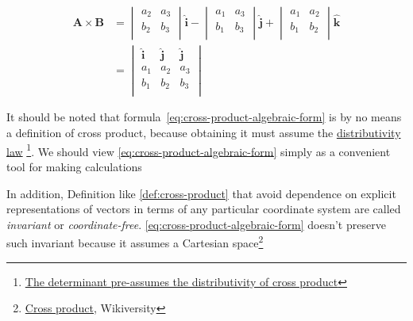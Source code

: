\begin{align}
    \boldsymbol{A} \times \boldsymbol{B} &=
    \begin{vmatrix}
        a_2 & a_3 \\
        b_2 & b_3 \\
    \end{vmatrix} \boldsymbol{\hat{i}} -
    \begin{vmatrix}
        a_1 & a_3 \\
        b_1 & b_3 \\
    \end{vmatrix} \boldsymbol{\hat{j}} +
    \begin{vmatrix}
        a_1 & a_2 \\
        b_1 & b_2 \\
    \end{vmatrix} \boldsymbol{\hat{k}} \\ &=
    \begin{vmatrix}
        \boldsymbol{\hat{i}} & \boldsymbol{\hat{j}} & \boldsymbol{\hat{j}} \\
        a_1 & a_2 & a_3 \\
        b_1 & b_2 & b_3 \\
    \end{vmatrix} \label{eq:cross-product-algebraic-form}
\end{align}

\begin{tcolorbox}[
    parbox=false,
    enhanced,
    colback=red!5!white,colframe=red!75!black,
    watermark tikz={\draw[line width=2mm] circle (1cm) node{\fontfamily{ptm}\fontseries{b}\fontsize{20mm}{20mm}\selectfont !};}
]
    It should be noted that formula~\ref{eq:cross-product-algebraic-form} is by no means a definition of cross product,
    because obtaining it must assume the \hyperref[eq:cross-product-assumed-distributivity]{distributivity law}
    \footnote{\href{https://math.stackexchange.com/questions/362139/how-to-prove-the-distributive-property-of-cross-product\#comment5670827\_362161}{The determinant pre-assumes the distributivity of cross product}}.
    We should view \ref{eq:cross-product-algebraic-form} simply as a convenient tool for making calculations

    In addition, Definition like \ref{def:cross-product} that avoid dependence on explicit representations of vectors in
    terms of any particular coordinate system are called \textit{invariant} or \textit{coordinate-free}.
    \ref{eq:cross-product-algebraic-form} doesn't preserve such invariant because it assumes a Cartesian
    space\footnote{\href{https://en.wikiversity.org/wiki/Cross_product\#Algebraic\_Definition}{Cross product}, Wikiversity}
\end{tcolorbox}

